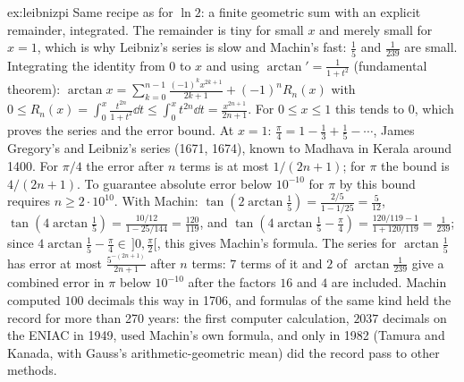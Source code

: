 \begin{solution}{ex:leibnizpi}
\idea Same recipe as for $\ln2$: a finite geometric sum with an explicit remainder, integrated. The remainder is tiny for small $x$ and merely small for $x=1$, which is why Leibniz's series is slow and Machin's fast: $\frac15$ and $\frac1{239}$ are small.
\writeup Integrating the identity from $0$ to $x$ and using $\arctan'=\frac1{1+t^2}$ (fundamental theorem): $\arctan x=\sum_{k=0}^{n-1}\frac{(-1)^kx^{2k+1}}{2k+1}+(-1)^nR_n(x)$ with $0\le R_n(x)=\int_0^x\frac{t^{2n}}{1+t^2}\dd t\le\int_0^xt^{2n}\dd t=\frac{x^{2n+1}}{2n+1}$. For $0\le x\le1$ this tends to $0$, which proves the series and the error bound. At $x=1$: $\frac\pi4=1-\frac13+\frac15-\cdots$, James Gregory's and Leibniz's series (1671, 1674), known to Madhava in Kerala around 1400.
For $\pi/4$ the error after $n$ terms is at most $1/(2n+1)$; for $\pi$ the bound is $4/(2n+1)$. To guarantee absolute error below $10^{-10}$ for $\pi$ by this bound requires $n\ge2\cdot10^{10}$. With Machin: $\tan\left(2\arctan\frac15\right)=\frac{2/5}{1-1/25}=\frac5{12}$, $\tan\left(4\arctan\frac15\right)=\frac{10/12}{1-25/144}=\frac{120}{119}$, and $\tan\left(4\arctan\frac15-\frac\pi4\right)=\frac{120/119-1}{1+120/119}=\frac1{239}$; since $4\arctan\frac15-\frac\pi4\in\,]0,\frac\pi2[$, this gives Machin's formula. The series for $\arctan\frac15$ has error at most $\frac{5^{-(2n+1)}}{2n+1}$ after $n$ terms: $7$ terms of it and $2$ of $\arctan\frac1{239}$ give a combined error in $\pi$ below $10^{-10}$ after the factors $16$ and $4$ are included. Machin computed $100$ decimals this way in 1706, and formulas of the same kind held the record for more than 270 years: the first computer calculation, $2037$ decimals on the ENIAC in 1949, used Machin's own formula, and only in 1982 (Tamura and Kanada, with Gauss's arithmetic-geometric mean) did the record pass to other methods.
\end{solution}

